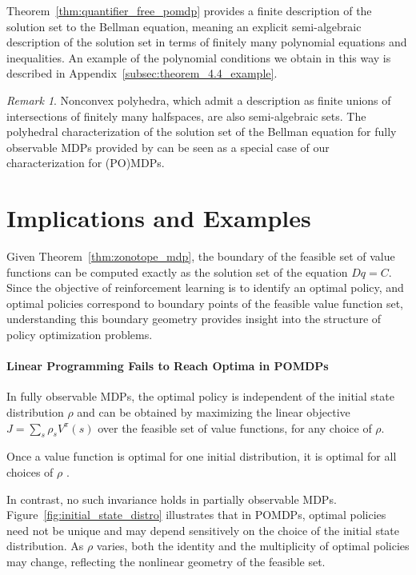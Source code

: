 \documentclass{article}
\theoremstyle{definition}
\theoremstyle{remark}
\newtheorem{remark}[theorem]{Remark}
\begin{document}
Theorem~\ref{thm:quantifier_free_pomdp} provides a finite description of the solution set to the Bellman equation,  meaning an explicit semi-algebraic description of the solution set in terms of finitely many polynomial equations and inequalities. An example of the polynomial conditions we obtain in this way is described in Appendix~\ref{subsec:theorem_4.4_example}.

\begin{remark} 
    Nonconvex polyhedra, which admit a description as finite unions of intersections of finitely many halfspaces, are also semi-algebraic sets. 
    The polyhedral characterization of the solution set of the Bellman equation for fully observable MDPs provided by \citet{dadashiValueFunctionPolytope2019} can be seen as a special case of our characterization for (PO)MDPs.  
\end{remark} 

\section{Implications and Examples}  

Given Theorem~\ref{thm:zonotope_mdp}, the boundary of the feasible set of value functions can be computed exactly as the solution set of the equation \( D q = C \). Since the objective of reinforcement learning is to identify an optimal policy, and optimal policies correspond to boundary points of the feasible value function set, understanding this boundary geometry provides insight into the structure of policy optimization problems.

\paragraph{Linear Programming Fails to Reach Optima in POMDPs}
In fully observable MDPs, the optimal policy is independent of the initial state distribution \(\rho\) and can be obtained by maximizing the linear objective $J = \sum_s \rho_s V^\pi(s)$ over the feasible set of value functions, for any choice of \(\rho\). 

Once a value function is optimal for one initial distribution, it is optimal for all choices of \(\rho\) \citep[Section~5.9.1]{putermanMarkovDecisionProcesses2005}. 

In contrast, no such invariance holds in partially observable MDPs. Figure~\ref{fig:initial_state_distro} illustrates that in POMDPs, optimal policies need not be unique and may depend sensitively on the choice of the initial state distribution. As \(\rho\) varies, both the identity and the multiplicity of optimal policies may change, reflecting the nonlinear geometry of the feasible set.
\end{document}
